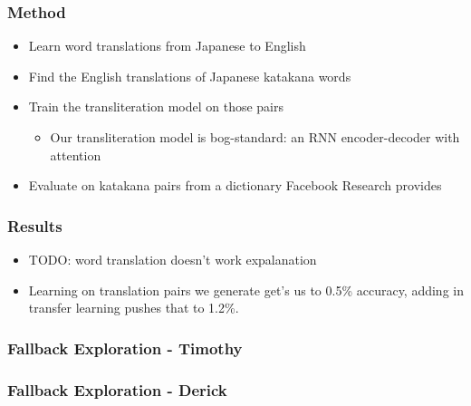 \documentclass{beamer}
\begin{document}
\begin{frame}
  \frametitle{Method}
  \begin{itemize}
  \item Learn word translations from Japanese to English
  \item Find the English translations of Japanese katakana words
  \item Train the transliteration model on those pairs
    \begin{itemize}
    \item Our transliteration model is bog-standard: an RNN encoder-decoder with
      attention
    \end{itemize}
  \item Evaluate on katakana pairs from a dictionary Facebook Research provides
  \end{itemize}
\end{frame}

\begin{frame}
  \frametitle{Results}
  \begin{itemize}
  \item TODO: word translation doesn't work expalanation
  \item Learning on translation pairs we generate get's us to 0.5\% accuracy,
    adding in transfer learning pushes that to 1.2\%.
  \end{itemize}
\end{frame}

\begin{frame}
  \frametitle{Fallback Exploration - Timothy}
\end{frame}

\begin{frame}
  \frametitle{Fallback Exploration - Derick}
\end{frame}
\end{document}

